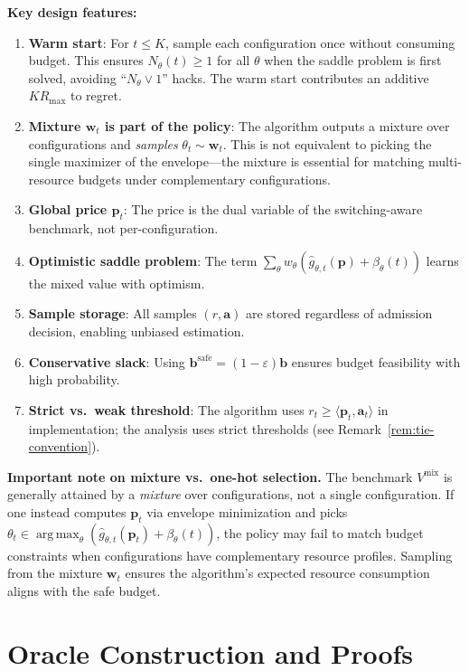 \documentclass[11pt]{article}
\newcommand{\bb}{\mathbf{b}}
\newcommand{\bbS}{\mathbf{b}^{\mathrm{safe}}}
\newcommand{\ba}{\mathbf{a}}
\newcommand{\bp}{\mathbf{p}}
\newcommand{\bw}{\mathbf{w}}
\DeclareMathOperator*{\argmax}{arg\,max}
\begin{document}
\textbf{Key design features:}
\begin{enumerate}
    \item \textbf{Warm start}: For $t \le K$, sample each configuration once without consuming budget. This ensures $N_\theta(t) \ge 1$ for all $\theta$ when the saddle problem is first solved, avoiding ``$N_\theta \vee 1$'' hacks. The warm start contributes an additive $K R_{\max}$ to regret.
    \item \textbf{Mixture $\bw_t$ is part of the policy}: The algorithm outputs a mixture over configurations and \emph{samples} $\theta_t \sim \bw_t$. This is not equivalent to picking the single maximizer of the envelope---the mixture is essential for matching multi-resource budgets under complementary configurations.
    \item \textbf{Global price $\bp_t$}: The price is the dual variable of the switching-aware benchmark, not per-configuration.
    \item \textbf{Optimistic saddle problem}: The term $\sum_\theta w_\theta(\widehat{g}_{\theta,t}(\bp) + \beta_\theta(t))$ learns the mixed value with optimism.
    \item \textbf{Sample storage}: All samples $(r, \ba)$ are stored regardless of admission decision, enabling unbiased estimation.
    \item \textbf{Conservative slack}: Using $\bbS = (1-\varepsilon)\bb$ ensures budget feasibility with high probability.
    \item \textbf{Strict vs.\ weak threshold}: The algorithm uses $r_t \ge \langle \bp_t, \ba_t \rangle$ in implementation; the analysis uses strict thresholds (see Remark~\ref{rem:tie-convention}).
\end{enumerate}

\textbf{Important note on mixture vs.\ one-hot selection.} The benchmark $V^{\mathrm{mix}}$ is generally attained by a \emph{mixture} over configurations, not a single configuration. If one instead computes $\bp_t$ via envelope minimization and picks $\theta_t \in \argmax_\theta(\widehat{g}_{\theta,t}(\bp_t) + \beta_\theta(t))$, the policy may fail to match budget constraints when configurations have complementary resource profiles. Sampling from the mixture $\bw_t$ ensures the algorithm's expected resource consumption aligns with the safe budget.

\section{Oracle Construction and Proofs}
\label{app:oracle-proof}
\end{document}
